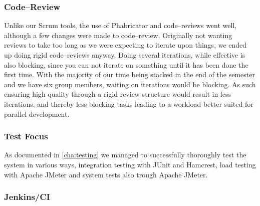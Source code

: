 \subsubsection{Code--Review}
Unlike our Scrum tools, the use of Phabricator and code--reviews went well, although a few changes were made to code--review.
Originally not wanting reviews to take too long as we were expecting to iterate upon things, we ended up doing rigid code--reviews anyway.
Doing several iterations, while effective is also blocking, since you can not iterate on something until it has been done the first time.
With the majority of our time being stacked in the end of the semester and we have six group members, waiting on iterations would be blocking.
As such ensuring high quality through a rigid review structure would result in less iterations, and thereby less blocking tasks leading to a workload better suited for parallel development.

\subsubsection{Test Focus}
As documented in \cref{cha:testing} we managed to successfully thoroughly test the system in various ways, integration testing with JUnit and Hamcrest, load testing with Apache JMeter and system tests also trough Apache JMeter.
\subsubsection{Jenkins/CI}
